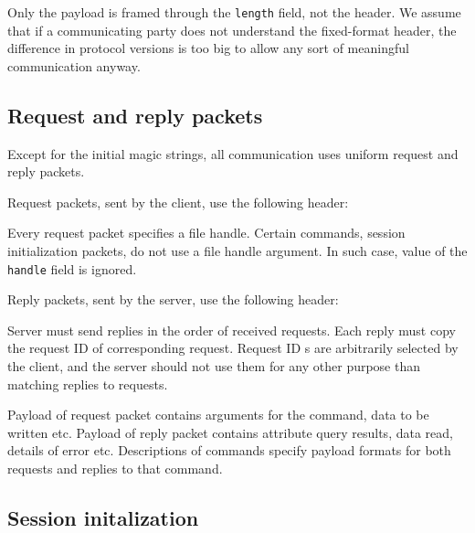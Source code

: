 Only the payload is framed through the {\tt length} field, not the header. We assume that if a communicating
party does not understand the fixed-format header, the difference in protocol versions is too big to allow any
sort of meaningful communication anyway.

%

\subsection{Request and reply packets}

Except for the initial magic strings, all communication uses uniform request and reply packets.

Request packets, sent by the client, use the following header:
\beginpk[p{2.7cm} p{7.3cm}]
\endpk

Every request packet specifies a file handle. Certain commands, session initialization packets, do not use
a file handle argument. In such case, value of the {\tt handle} field is ignored.

Reply packets, sent by the server, use the following header:
\beginpk[p{2.7cm} p{7.3cm}]
\endpk

Server must send replies in the order of received requests. Each reply must copy the request ID of
corresponding request. Request ID s are arbitrarily selected by the client, and the server should not use them
for any other purpose than matching replies to requests.

Payload of request packet contains arguments for the command, data to be written etc. Payload of reply
packet contains attribute query results, data read, details of error etc. Descriptions of commands specify
payload formats for both requests and replies to that command.

%

\subsection{Session initalization}

